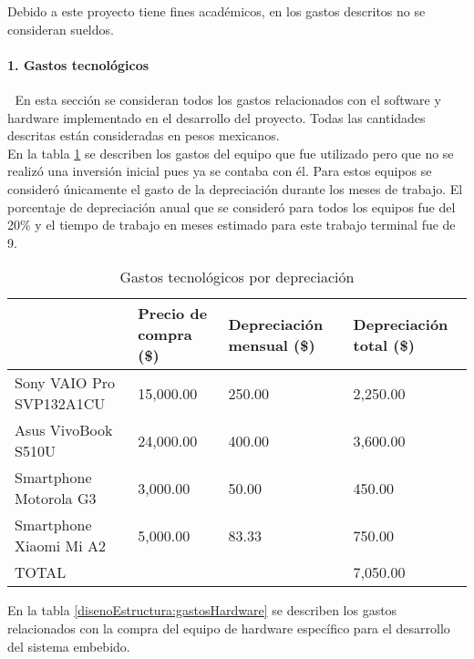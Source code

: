 Debido a este proyecto tiene fines académicos, en los gastos descritos no se consideran sueldos.


\paragraph{1. Gastos tecnológicos} \textcolor{White}{.} \newline
En esta sección se consideran todos los gastos relacionados con el software y hardware implementado en el desarrollo del proyecto. Todas las cantidades descritas están consideradas en pesos mexicanos.\\

En la tabla \ref{disenoEstructura:gastosDepreciacion} se describen los gastos del equipo que fue utilizado pero que no se realizó una inversión inicial pues ya se contaba con él. Para estos equipos se consideró únicamente el gasto de la depreciación durante los meses de trabajo. El porcentaje de depreciación anual que se consideró para todos los equipos fue del 20\% y el tiempo de trabajo en meses estimado para este trabajo terminal fue de 9.

\begin{table}[htbp]
	\begin{center}
		\begin{tabular}{|p{4cm}|p{3cm}|p{3cm}|p{3cm}|}
			\hline
			\thead{Equipo}&\thead{Precio de compra\\(\$)}&\thead{Depreciación mensual\\(\$)}&\thead{Depreciación total\\(\$)} \\
			\hline
			\hline
			Sony VAIO Pro SVP132A1CU &15,000.00 &250.00&2,250.00 \\
			\hline
			Asus VivoBook S510U & 24,000.00&400.00&3,600.00 \\
			\hline
			Smartphone Motorola G3 &3,000.00 &50.00&450.00\\
			\hline
			Smartphone Xiaomi Mi A2 & 5,000.00&83.33&750.00\\
			\hline
			\hline
			TOTAL & &&7,050.00\\
			\hline
		\end{tabular}
		\caption{Gastos tecnológicos por depreciación}
		\label{disenoEstructura:gastosDepreciacion}
	\end{center}
\end{table}

En la tabla \ref{disenoEstructura:gastosHardware} se describen los gastos relacionados con la compra del equipo de hardware específico para el desarrollo del sistema embebido.

